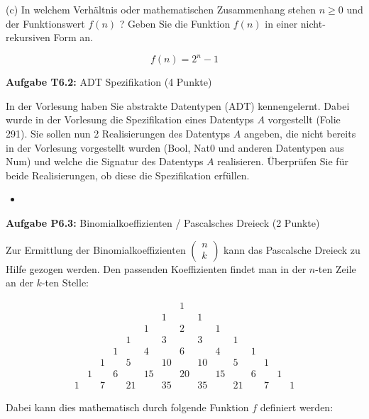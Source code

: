 (c) In welchem Verhältnis oder mathematischen Zusammenhang stehen $n \geq 0$ und der Funktionswert $f(n)$ ? Geben Sie die Funktion $f(n)$ in einer nicht-rekursiven Form an.

$$
f(n)=2^n-1
$$

\newpage

\textbf{Aufgabe T6.2:} ADT Spezifikation (4 Punkte)

In der Vorlesung haben Sie abstrakte Datentypen (ADT) kennengelernt. Dabei wurde in der Vorlesung die Spezifikation eines Datentyps $A$ vorgestellt (Folie 291). Sie sollen nun 2 Realisierungen des Datentyps $A$ angeben, die nicht bereits in der Vorlesung vorgestellt wurden (Bool, Nat0 und anderen Datentypen aus Num) und welche die Signatur des Datentyps $A$ realisieren. Überprüfen Sie für beide Realisierungen, ob diese die Spezifikation erfüllen.

\begin{itemize}
  \item []\inputminted{Haskell}{A6_2.hs}
\end{itemize}

\newpage

\textbf{Aufgabe P6.3:} Binomialkoeffizienten / Pascalsches Dreieck (2 Punkte)

Zur Ermittlung der Binomialkoeffizienten $\left(\begin{array}{l}n \\ k\end{array}\right)$ kann das Pascalsche Dreieck zu Hilfe gezogen werden. Den passenden Koeffizienten findet man in der $n$-ten Zeile an der $k$-ten Stelle:

$$
\begin{array}{cccccccccccccccc} 
  & & & & & & & 1 & & & & & & & \\ 
  & & & & & & 1 & & 1 & & & & & \\ 
  & & & & & 1 & & 2 & & 1 & & & & \\ 
  & & & & 1 & & 3 & & 3 & & 1 & & & \\ 
  & & & 1 & & 4 & & 6 & & 4 & & 1 & & \\ 
  & & 1 & & 5 & & 10 & & 10 & & 5 & & 1 & & 
  \\ & 1 & & 6 & & 15 & & 20 & & 15 & & 6 & & 1 & 
  \\ 1 & & 7 & & 21 & & 35 & & 35 & & 21 & & 7 & & 1
\end{array}
$$

Dabei kann dies mathematisch durch folgende Funktion $f$ definiert werden:

